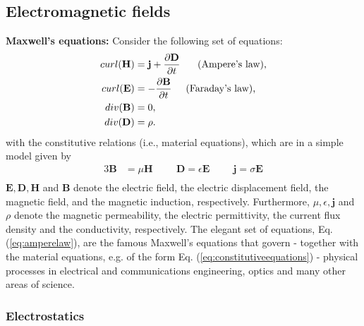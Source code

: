 \subsection{Electromagnetic fields}

\textbf{Maxwell's equations:} \newline Consider the following set of
equations:%
\begin{align}
curl(\mathbf{H})  &  =\mathbf{j}+\frac{\partial\mathbf{D}}{\partial t}%
\hspace{0.5cm}\text{ (Ampere's law),}\label{eq:amperelaw}\\
curl(\mathbf{E})  &  =-\frac{\partial\mathbf{B}}{\partial t}\hspace
{0.5cm}\text{(Faraday's law),}\label{eq:faradaylaw}\\
div(\mathbf{B})  &  =0,\label{eq:Maxwell3}\\
div(\mathbf{D})  &  =\rho. \label{eq:Maxwell4}%
\end{align}
with the constitutive relations (i.e., material equations), which are in a
simple model given by
\begin{alignat}{3}
\label{eq:constitutiveequations}\mathbf{B}  &  =\mu\mathbf{H}\hspace
{1cm}\mathbf{D}=\epsilon\mathbf{E}\hspace{1cm}\mathbf{j}=\sigma\mathbf{E}\\
&
\end{alignat}
$\mathbf{E},\mathbf{D},\mathbf{H}$ and $\mathbf{B}$ denote the electric field,
the electric displacement field, the magnetic field, and the magnetic
induction, respectively. Furthermore, $\mu,\epsilon,\mathbf{j}$ and $\rho$
denote the magnetic permeability, the electric permittivity, the current flux
density and the conductivity, respectively. The elegant set of equations, Eq.
(\ref{eq:amperelaw}), are the famous Maxwell's equations that govern -
together with the material equations, e.g. of the form Eq.
(\ref{eq:constitutiveequations}) - physical processes in electrical and
communications engineering, optics and many other areas of science.\newline 

\subsubsection{Electrostatics \newline }

